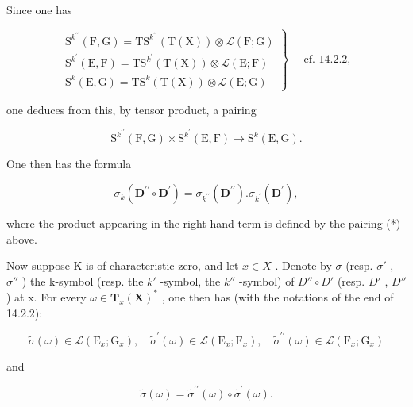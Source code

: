 Since one has

\[
\left. \begin{array}{l} \mathrm{S} ^ {k ^ {\prime \prime}} (\mathrm{F}, \mathrm{G}) = \mathrm{TS} ^ {k ^ {\prime \prime}} (\mathrm{T} (\mathrm{X})) \otimes \mathscr {L} (\mathrm{F}; \mathrm{G}) \\ \mathrm{S} ^ {k ^ {\prime}} (\mathrm{E}, \mathrm{F}) = \mathrm{TS} ^ {k ^ {\prime}} (\mathrm{T} (\mathrm{X})) \otimes \mathscr {L} (\mathrm{E}; \mathrm{F}) \\ \mathrm{S} ^ {k} (\mathrm{E}, \mathrm{G}) = \mathrm{TS} ^ {k} (\mathrm{T} (\mathrm{X})) \otimes \mathscr {L} (\mathrm{E}; \mathrm{G}) \end{array} \right\} \quad \text { cf. } 1 4. 2. 2,
\]

one deduces from this, by tensor product, a pairing

\[
\mathrm{S} ^ {k ^ {\prime \prime}} (\mathrm{F}, \mathrm{G}) \times \mathrm{S} ^ {k ^ {\prime}} (\mathrm{E}, \mathrm{F}) \rightarrow \mathrm{S} ^ {k} (\mathrm{E}, \mathrm{G}).\tag{*}
\]

One then has the formula

\[
\sigma_ {k} (\mathbf {D} ^ {\prime \prime} \circ \mathbf {D} ^ {\prime}) = \sigma_ {k ^ {\prime \prime}} (\mathbf {D} ^ {\prime \prime}). \sigma_ {k ^ {\prime}} (\mathbf {D} ^ {\prime}),
\]

where the product appearing in the right-hand term is defined by the pairing (*) above.

Now suppose K is of characteristic zero, and let \(x \in X\) . Denote by \(\sigma\) (resp. \(\sigma'\) , \(\sigma''\) ) the k-symbol (resp. the \(k'\) -symbol, the \(k''\) -symbol) of \(D'' \circ D'\) (resp. \(D'\) , \(D''\) ) at x. For every \(\omega \in \mathbf{T}_{x}(\mathbf{X})^{*}\) , one then has (with the notations of the end of 14.2.2):

\[
\tilde {\sigma} (\omega) \in \mathscr {L} (\mathrm{E} _ {x}; \mathrm{G} _ {x}), \quad \tilde {\sigma} ^ {\prime} (\omega) \in \mathscr {L} (\mathrm{E} _ {x}; \mathrm{F} _ {x}), \quad \tilde {\sigma} ^ {\prime \prime} (\omega) \in \mathscr {L} (\mathrm{F} _ {x}; \mathrm{G} _ {x})
\]

and

\[
\tilde {\sigma} (\omega) = \tilde {\sigma} ^ {\prime \prime} (\omega) \circ \tilde {\sigma} ^ {\prime} (\omega).
\]

